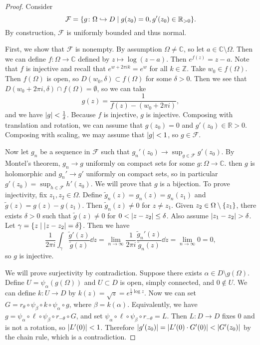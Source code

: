\documentclass[leqno, openany]{memoir}
\theoremstyle{definition}
\theoremstyle{remark}
\theoremstyle{plain}
\theoremstyle{definition}
\theoremstyle{remark}
\newcommand{\R}{\mathbb{R}}
\newcommand{\C}{\mathbb{C}}
\newcommand{\Z}{\mathbb{Z}}
\newcommand{\mc}[1]{\mathcal{#1}}
\newcommand{\wt}[1]{\widetilde{#1}}
\begin{document}
\begin{proof}
    Consider 
    \[ \mc{F} = \qty{g \colon \Omega \hookrightarrow D \mid g(z_0) = 0, g'(z_0) \in \R_{>0}}. \]
    By construction, $\mc{F}$ is uniformly bounded and thus normal.

    First, we show that $\mc{F}$ is nonempty. By assumption $\Omega \neq \C$, so let $a \in \C \setminus \Omega$. Then we can define $f \colon \Omega \to \C$ defined by $z \mapsto \log(z-a)$. Then $e^{f(z)} = z-a$. Note that $f$ is injective and recall that $e^{w + 2\pi i k} = e^w$ for all $k \in \Z$. Take $w_0 \in f(\Omega)$. Then $f(\Omega)$ is open, so $D(w_0, \delta) \subset f(\Omega)$ for some $\delta > 0$. Then we see that $D(w_0 + 2 \pi i, \delta) \cap f(\Omega) = \emptyset$, so we can take
    \[ g(z) = \frac{1}{f(z) - (w_0 + 2 \pi i)}, \]
    and we have $\abs{g} < \frac{1}{\delta}$. Because $f$ is injective, $g$ is injective. Composing with translation and rotation, we can assume that $g(z_0) = 0$ and $g'(z_0) \in \R > 0$. Composing with scaling, we may assume that $\abs{g} < 1$, so $g \in \mc{F}$.

    Now let $g_n$ be a sequence in $\mc{F}$ such that $g_n'(z_0) \to \sup_{g \in \mc{F}} g'(z_0)$. By Montel's theorem, $g_n \to g$ uniformly on compact sets for some $g \colon \Omega \to \C$. then $g$ is holomorphic and $g_n' \to g'$ uniformly on compact sets, so in particular $g'(z_0) = \sup_{h \in \mc{F}} h'(z_0)$. We will prove that $g$ is a bijection. To prove injectivity, fix $z_1, z_2 \in \Omega$. Define $\wt{g}_n(z) = g_n(z) = g_n(z_1)$ and $\wt{g}(z) = g(z) - g(z_1)$. Then $\wt{g}_n(z) \neq 0$ for $z \neq z_1$. Given $z_2 \in \Omega \setminus \qty{z_1}$, there exists $\delta > 0$ such that $\wt{g}(z) \neq 0$ for $0 < \abs{z - z_2} \leq \delta$. Also assume $\abs{z_1 - z_2} > \delta$. Let $\gamma = \qty{z \mid \abs{z-z_2} = \delta}$. Then we have
    \[ \frac{1}{2 \pi i} \int_{\gamma} \frac{\wt{g}'(z)}{\wt{g}(z)} \dd{z} = \lim_{n \to \infty} \frac{1}{2 \pi i} \frac{\wt{g}_n'(z)}{\wt{g}_n(z)} \dd{z} = \lim_{n \to \infty} 0 = 0, \]
    so $g$ is injective.

    We will prove surjectivity by contradiction. Suppose there exists $\alpha \in D \setminus g(\Omega)$. Define $U = \psi_{\alpha}(g(\Omega))$ and $U \subset D$ is open, simply connected, and $0 \notin U$. We can define $k \colon U \to D$ by $k(z) = \sqrt{z} = e^{\frac{1}{2} \log z}$. Now we can set $G = r_{\theta} \circ \psi_{\beta} \circ k \circ \psi_{\alpha} \circ g$, where $\beta = k(\alpha)$. Equivalently, we have $g = \psi_{\alpha} \circ\ell \circ \psi_{\beta} \circ r_{-\theta} \circ G$, and set $\psi_{\alpha} \circ \ell \circ \psi_{\beta} \circ r_{-\theta} = L$. Then $L \colon D \to D$ fixes $0$ and is not a rotation, so $\abs{L'(0)} < 1$. Therefore $\abs{g'(z_0)} = \abs{L'(0) \cdot G'(0)} < \abs{G'(z_0)}$ by the chain rule, which is a contradiction.
\end{proof}
\end{document}
